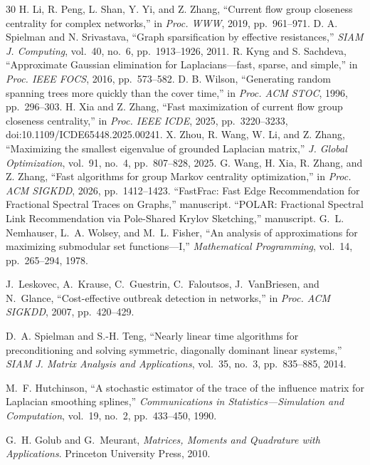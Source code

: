 \begin{thebibliography}{30}
 H. Li, R. Peng, L. Shan, Y. Yi, and Z. Zhang,
``Current flow group closeness centrality for complex networks,''
in \emph{Proc. WWW}, 2019, pp.~961--971.
 D. A. Spielman and N. Srivastava,
``Graph sparsification by effective resistances,''
\emph{SIAM J. Computing}, vol.~40, no.~6, pp.~1913--1926, 2011.
 R. Kyng and S. Sachdeva,
``Approximate Gaussian elimination for Laplacians---fast, sparse, and
simple,'' in \emph{Proc. IEEE FOCS}, 2016, pp.~573--582.
 D. B. Wilson,
``Generating random spanning trees more quickly than the cover time,''
in \emph{Proc. ACM STOC}, 1996, pp.~296--303.
 H. Xia and Z. Zhang,
``Fast maximization of current flow group closeness centrality,''
in \emph{Proc. IEEE ICDE}, 2025, pp.~3220--3233,
doi:10.1109/ICDE65448.2025.00241.
 X. Zhou, R. Wang, W. Li, and Z. Zhang,
``Maximizing the smallest eigenvalue of grounded Laplacian matrix,''
\emph{J. Global Optimization}, vol.~91, no.~4, pp.~807--828, 2025.
 G. Wang, H. Xia, R. Zhang, and Z. Zhang,
``Fast algorithms for group Markov centrality optimization,''
in \emph{Proc. ACM SIGKDD}, 2026, pp.~1412--1423.
 ``FastFrac: Fast Edge Recommendation for Fractional
Spectral Traces on Graphs,'' manuscript.
 ``POLAR: Fractional Spectral Link Recommendation via
Pole-Shared Krylov Sketching,'' manuscript.
G.~L. Nemhauser, L.~A. Wolsey, and M.~L. Fisher,
``An analysis of approximations for maximizing submodular set functions---I,''
\emph{Mathematical Programming}, vol.~14, pp.~265--294, 1978.


J.~Leskovec, A.~Krause, C.~Guestrin, C.~Faloutsos,
J.~VanBriesen, and N.~Glance,
``Cost-effective outbreak detection in networks,''
in \emph{Proc. ACM SIGKDD}, 2007, pp.~420--429.


D.~A. Spielman and S.-H. Teng,
``Nearly linear time algorithms for preconditioning and solving symmetric,
diagonally dominant linear systems,''
\emph{SIAM J. Matrix Analysis and Applications},
vol.~35, no.~3, pp.~835--885, 2014.


M.~F. Hutchinson,
``A stochastic estimator of the trace of the influence matrix for Laplacian smoothing splines,''
\emph{Communications in Statistics---Simulation and Computation},
vol.~19, no.~2, pp.~433--450, 1990.


G.~H. Golub and G.~Meurant,
\emph{Matrices, Moments and Quadrature with Applications}.
Princeton University Press, 2010.



\end{thebibliography}
